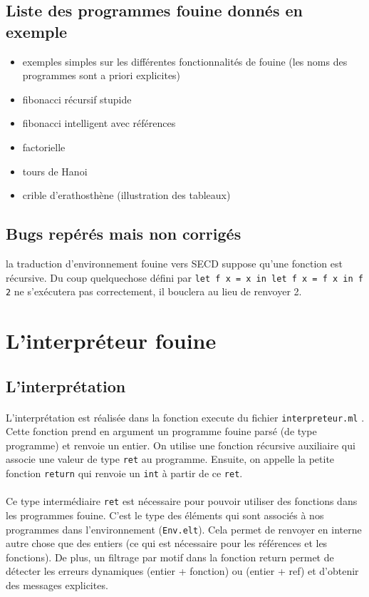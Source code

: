 \subsection{Liste des programmes fouine donnés en exemple}

\begin{itemize}
 \item exemples simples sur les différentes fonctionnalités de fouine (les noms des programmes sont a priori explicites)
 \item fibonacci récursif stupide
 \item fibonacci intelligent avec références
 \item factorielle
 \item tours de Hanoi
 \item crible d'erathosthène (illustration des tableaux)
\end{itemize}

\subsection{Bugs repérés mais non corrigés}

la traduction d'environnement fouine vers SECD suppose qu'une fonction est récursive. Du coup quelquechose défini par
\texttt{let f x = x in let f x = f x in f 2} ne s'exécutera pas correctement, il bouclera au lieu de renvoyer 2.

\section{L'interpréteur fouine} %

\subsection{L'interprétation}

\paragraph{} L'interprétation est réalisée dans la fonction execute du fichier \texttt{interpreteur.ml} . Cette fonction prend en argument un programme fouine parsé (de type programme) et renvoie un entier. On utilise une fonction récursive auxiliaire qui associe une valeur de type \texttt{ret} au programme. Ensuite, on appelle la petite fonction \texttt{return} qui renvoie un \texttt{int} à partir de ce \texttt{ret}.

\paragraph{} Ce type intermédiaire \texttt{ret} est nécessaire pour pouvoir utiliser des fonctions dans les programmes fouine. C'est le type des éléments qui sont associés à nos programmes dans l'environnement (\texttt{Env.elt}). Cela permet de renvoyer en interne autre chose que des entiers (ce qui est nécessaire pour les références et les fonctions). De plus, un filtrage par motif dans la fonction return permet de détecter les erreurs dynamiques (entier + fonction) ou (entier + ref) et d'obtenir des messages explicites.

